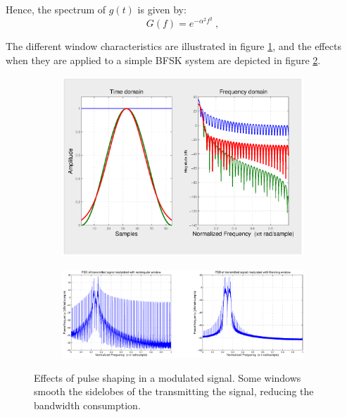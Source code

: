 \documentclass[12pt,a4paper,openright]{report}
\begin{document}
  Hence, the spectrum of $g(t)$ is given by: 
\begin{equation}
G(f) = {e^{ - {\alpha ^2}{f^2}}}\ ,
\end{equation}

The different window characteristics are illustrated in figure \ref{fig:wc}, and the effects when they are applied to a simple BFSK system are depicted in figure \ref{fig:wcomp}.
 \begin{figure}[H]
 \centering
  \label{fig:wincar}
\begin{subfigure}[H]{1\textwidth}
 \centering
    \includegraphics[scale=0.45, trim=0 0 30cm 0, clip=true]{wincomp.eps}
    \label{fig:wc}
\end{subfigure}

\qquad
\qquad

\begin{subfigure}[H]{1\textwidth}
 \centering
    \includegraphics[scale=0.38]{txwinrectVShann.eps}
    \label{fig:wcomp}
    
    \end{subfigure}
    
    \caption[Effects of pulse shaping in a modulated signal]{Effects of pulse shaping in a modulated signal. Some windows smooth the sidelobes of the transmitting the signal, reducing the bandwidth consumption.}
    \label{fig:main}
\end{figure}
\end{document}
